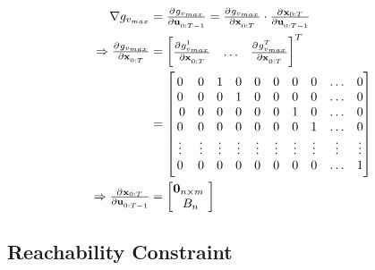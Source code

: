 \begin{align}
\nabla g_{v_{max}} &= \pd{g_{v_{max}}}{\u_{0:T-1}} = \pd{g_{v_{max}}}{\x_{0:T}} \cdot \pd{\x_{0:T}}{\u_{0:T-1}} \\
\Rightarrow \pd{g_{v_{max}}}{\x_{0:T}} &= \begin{bmatrix} \pd{g_{v_{max}}^1}{\x_{0:T}} & \hdots & \pd{g_{v_{max}}^T}{\x_{0:T}}\end{bmatrix}^T  \\
&= \begin{bmatrix} 
0 & 0 & 1 & 0 & 0 & 0 & 0 & 0 & \hdots & 0 \\ 
0 & 0 & 0 & 1 & 0 & 0 & 0 & 0 & \hdots & 0 \\  
0 & 0 & 0 & 0 & 0 & 0 & 1 & 0 & \hdots & 0 \\
0 & 0 & 0 & 0 & 0 & 0 & 0 & 1 & \hdots & 0 \\ 
\vdots & \vdots & \vdots & \vdots & \vdots & \vdots & \vdots & \vdots & \vdots & \vdots \\
0 & 0 & 0 & 0 & 0 & 0 & 0 & 0 & \hdots & 1 \end{bmatrix} \\
\Rightarrow \pd{\x_{0:T}}{\u_{0:T-1}} &= \begin{bmatrix} \mathbf{0}_{n \times m} \\ B_n \end{bmatrix}
\end{align}
 

\subsection{Reachability Constraint}
\label{text:approach/constraint/reachability}


